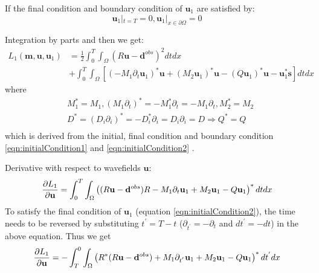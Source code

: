 \documentclass[pdftex,a4paper,parskip,listof=totoc,bibliography=totoc,onehalfspacing,12pt]{scrreprt}
\begin{document}
\par If the final condition and boundary condition of $\mathbf{u}_{1}$ are satisfied by:
\begin{equation}
\label{eqn:initialCondition2}
 \mathbf{u}_{1}|_{t=T} = 0, \mathbf{u}_{1}|_{x\in \partial \Omega} = 0
\end{equation}
\par Integration by parts and then we get:
\begin{equation}
\begin{split}
L_1(\mathbf{m}, \mathbf{u},\mathbf{u}_{1})
  &= \frac{1}{2} \int_0^T \int_\Omega (R\mathbf{u} - \mathbf{d}^{obs})^2 dt dx\\ &+ \int_0^T \int_\Omega [(-M_1 \partial_{t} \mathbf{u}_{1})^* \mathbf{u} + (M_2 \mathbf{u}_{1})^* \mathbf{u} - (Q \mathbf{u}_{1})^* \mathbf{u} - \mathbf{u}_{1}^* \mathbf{s} ] dt dx
 \end{split}
\end{equation}
where 
\begin{equation}
\begin{split}
& M_1^{*} =  M_1, (M_1 \partial_{t}) ^{*} = -M_1^{*} \partial_{t} = -M_1 \partial_{t}, M_2^{*} =  M_2\\
& D^{*} = (D_i \partial_{i})^{*} = -D_i^{*} \partial_{i} = D_i \partial_{i} = D \Rightarrow Q^{*} = Q\\
 \end{split}
\end{equation}
which is derived from the initial, final condition and boundary condition \ref{eqn:initialCondition1} and \ref{eqn:initialCondition2} \citep{yang2016review}.\\
\par Derivative with respect to wavefields $\mathbf{u}$:
\begin{equation}
 \pdv{L_1}{\mathbf{u}} = \int_0^T \int_\Omega \left((R\mathbf{u} - \mathbf{d}^{obs})R -M_1 \partial_{t} \mathbf{u}_{1}  + M_2 \mathbf{u}_{1} - Q \mathbf{u}_{1}\right)^{*}  dt dx
\end{equation}
To satisfy the final condition of $\mathbf{u}_{1}$ (equation \ref{eqn:initialCondition2}), the time needs to be reversed by substituting $t^{'}=T-t$ ($\partial_{t^{'}} = -\partial_{t}$ and $dt^{'}=-dt$) in the above equation. Thus we get
\begin{equation}
 \pdv{L_1}{\mathbf{u}} = -\int_T^0 \int_\Omega \left( R^{*}(R\mathbf{u} - \mathbf{d}^{obs}) + M_1 \partial_{t^{'}} \mathbf{u}_{1} + M_2 \mathbf{u}_{1} - Q \mathbf{u}_{1} \right)^{*} dt^{'} dx
\end{equation}
\end{document}
